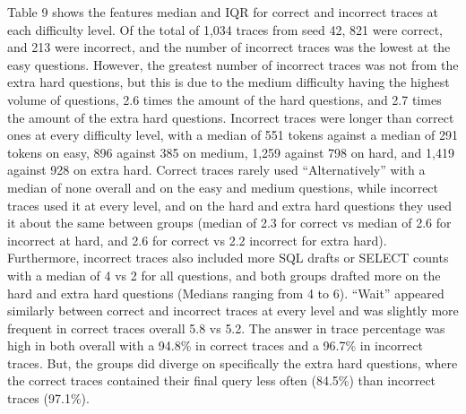 Table 9 shows the features median and IQR for correct and incorrect traces at each difficulty level. Of the total of 1,034 traces from seed 42, 821 were correct, and 213 were incorrect, and the number of incorrect traces was the lowest at the easy questions. However, the greatest number of incorrect traces was not from the extra hard questions, but this is due to the medium difficulty having the highest volume of questions, 2.6 times the amount of the hard questions, and 2.7 times the amount of the extra hard questions. Incorrect traces were longer than correct ones at every difficulty level, with a median of 551 tokens against a median of 291 tokens on easy, 896 against 385 on medium, 1,259 against 798 on hard, and 1,419 against 928 on extra hard. Correct traces rarely used ``Alternatively'' with a median of none overall and on the easy and medium questions, while incorrect traces used it at every level, and on the hard and extra hard questions they used it about the same between groups (median of 2.3 for correct vs median of 2.6 for incorrect at hard, and 2.6 for correct vs 2.2 incorrect for extra hard). Furthermore, incorrect traces also included more SQL drafts or SELECT counts with a median of 4 vs 2 for all questions, and both groups drafted more on the hard and extra hard questions (Medians ranging from 4 to 6). ``Wait'' appeared similarly between correct and incorrect traces at every level and was slightly more frequent in correct traces overall 5.8 vs 5.2. The answer in trace percentage was high in both overall with a 94.8\% in correct traces and a 96.7\% in incorrect traces. But, the groups did diverge on specifically the extra hard questions, where the correct traces contained their final query less often (84.5\%) than incorrect traces (97.1\%).

